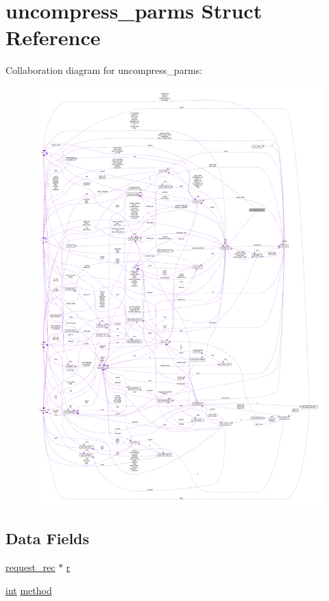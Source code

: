 \hypertarget{structuncompress__parms}{}\section{uncompress\+\_\+parms Struct Reference}
\label{structuncompress__parms}


Collaboration diagram for uncompress\+\_\+parms\+:
\nopagebreak
\begin{figure}[H]
\begin{center}
\leavevmode
\includegraphics[width=350pt]{structuncompress__parms__coll__graph}
\end{center}
\end{figure}
\subsection*{Data Fields}
\begin{DoxyCompactItemize}
\item 
\hyperlink{structrequest__rec}{request\+\_\+rec} $\ast$ \hyperlink{structuncompress__parms_af09392302ab3d5bdcea149654ee0dd39}{r}
\item 
\hyperlink{pcre_8txt_a42dfa4ff673c82d8efe7144098fbc198}{int} \hyperlink{structuncompress__parms_a1d90e541ca57d8a7e5bf8c0a2d074544}{method}
\end{DoxyCompactItemize}


